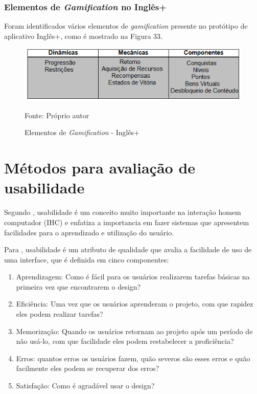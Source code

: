 \documentclass[
	12pt,				%
	openany,			%
	oneside,			%
	a4paper,			%
	english,			%
	french,				%
	spanish,			%
	brazil				%
	]{abntex2}
\begin{document}
\subsection{Elementos de \textit{Gamification} no Inglês+}
	Foram identificados vários elementos de \textit{gamification} presente no protótipo de aplicativo Inglês+, como é mostrado na Figura 33.




\begin{figure}[H]
    \centering
\caption{Elementos de \textit{Gamification} - Inglês+}
\includegraphics[width=12cm]{figuras/elementosingles.png}
\par
 Fonte: Próprio autor
\end{figure}




\chapter{Métodos para avaliação de usabilidade}
Segundo , usabilidade é um conceito muito importante na interação homem computador (IHC) e enfatiza a importancia em fazer sistemas que apresentem facilidades para o aprendizado e utilização do usuário.

Para , usabilidade é um atributo de qualidade que avalia a facilidade de uso de uma interface, que é definida em cinco componentes:

\begin{enumerate}
\item Aprendizagem: Como é fácil para os usuários realizarem tarefas básicas na primeira vez que encontrarem o design?
\item Eficiência: Uma vez que os usuários aprenderam o projeto, com que rapidez eles podem realizar tarefas?
\item Memorização: Quando os usuários retornam ao projeto após um período de não usá-lo, com que facilidade eles podem restabelecer a proficiência?
\item Erros: quantos erros os usuários fazem, quão severos são esses erros e quão facilmente eles podem se recuperar dos erros?
\item Satisfação: Como é agradável usar o design?
\end{enumerate}
\end{document}
